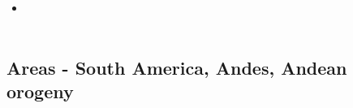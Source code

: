 \begin{scriptsize}
\begin{itemize}
\item[\twothousandone]
\textcite{tasg01} \\
\textcite{tack01} \\
\end{itemize}
\end{scriptsize}



\subsection{Areas - South America, Andes, Andean orogeny}

